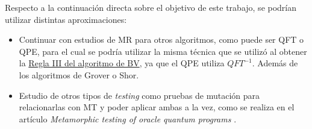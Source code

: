 \newpage
Respecto a la continuación directa sobre el objetivo de este trabajo, se podrían utilizar distintas aproximaciones:

\begin{itemize}
    \item Continuar con estudios de MR para otros algoritmos, como puede ser QFT o QPE, para el cual se podría utilizar la misma técnica que se utilizó al obtener la \hyperref[RIII:BV]{Regla III del algoritmo de BV}, ya que el QPE utiliza $QFT^{-1}$. Además de los algoritmos de Grover o Shor.

    \item Estudio de otros tipos de \textit{testing} como pruebas de mutación para relacionarlas con MT y poder aplicar ambas a la vez, como se realiza en el artículo \textit{Metamorphic testing of oracle quantum programs} \cite{metamorphicAdd:2022}.
\end{itemize}